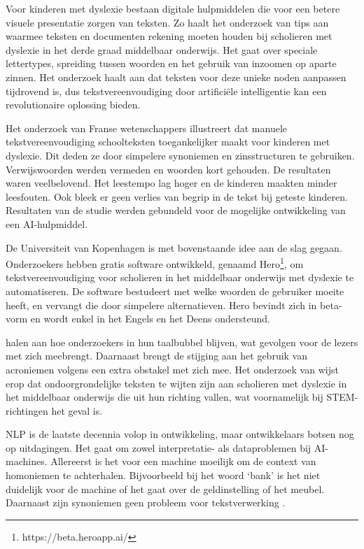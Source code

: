 Voor kinderen met dyslexie bestaan digitale hulpmiddelen die voor een betere visuele presentatie zorgen van teksten. Zo haalt het onderzoek van \textcite{Rello2012} tips aan waarmee teksten en documenten rekening moeten houden bij scholieren met dyslexie in het derde graad middelbaar onderwijs. Het gaat over speciale lettertypes, spreiding tussen woorden en het gebruik van inzoomen op aparte zinnen. Het onderzoek haalt aan dat teksten voor deze unieke noden aanpassen tijdrovend is, dus tekstvereenvoudiging door artificiële intelligentie kan een revolutionaire oplossing bieden. 

Het onderzoek van Franse wetenschappers \newline \textcite{Gala2016} illustreert dat manuele tekstvereenvoudiging schoolteksten toegankelijker maakt voor kinderen met dyslexie. Dit deden ze door simpelere synoniemen en zinsstructuren te gebruiken. Verwijswoorden werden vermeden en woorden kort gehouden. De resultaten waren veelbelovend. Het leestempo lag hoger en de kinderen maakten minder leesfouten. Ook bleek er geen verlies van begrip in de tekst bij geteste kinderen. Resultaten van de studie werden gebundeld voor de mogelijke ontwikkeling van een AI-hulpmiddel.

De Universiteit van Kopenhagen is met bovenstaande idee aan de slag gegaan. Onderzoekers \textcite{Bingel2018} hebben gratis software ontwikkeld, genaamd Hero\footnote{https://beta.heroapp.ai/}, om tekstvereenvoudiging voor scholieren in het middelbaar onderwijs met dyslexie te automatiseren. De software bestudeert met welke woorden de gebruiker moeite heeft, en vervangt die door simpelere alternatieven. Hero bevindt zich in beta-vorm en wordt enkel in het Engels en het Deens ondersteund. 

\textcite{PlavenSigray2017} halen aan hoe onderzoekers in hun taalbubbel blijven, wat gevolgen voor de lezers met zich meebrengt. Daarnaast brengt de stijging aan het gebruik van acroniemen volgens \textcite{Barnett2020} een extra obstakel met zich mee. Het onderzoek van \textcite{Donato2022} wijst erop dat ondoorgrondelijke teksten te wijten zijn aan scholieren met dyslexie in het middelbaar onderwijs die uit hun richting vallen, wat voornamelijk bij STEM-richtingen het geval is. 

NLP is de laatste decennia volop in ontwikkeling, maar ontwikkelaars botsen nog op uitdagingen. Het gaat om zowel interpretatie- als dataproblemen bij AI-machines. Allereerst is het voor een machine moeilijk om de context van homoniemen te achterhalen. Bijvoorbeeld bij het woord ‘bank’ is het niet duidelijk voor de machine of het gaat over de geldinstelling of het meubel. Daarnaast zijn synoniemen geen probleem voor tekstverwerking \autocite{Roldos2020}.

